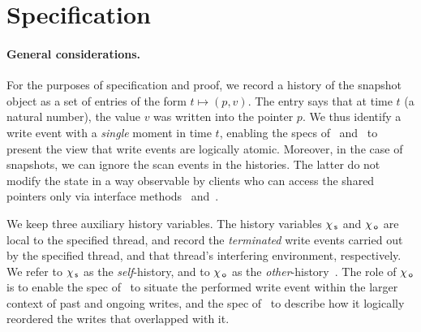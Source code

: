 \section{Specification}
\label{sc:formal}


\def\histx{\hist_\x}
\def\histy{\hist_\y}
\def\histp{\hist_p}

\newcommand{\sx}{S_\x}
\newcommand{\sy}{S_\y}
\newcommand{\spp}{S_p}
\newcommand{\sss}{S_s}
\newcommand{\wx}{W_\x}
\newcommand{\wy}{W_\y}
\newcommand{\wpp}{W_p}


\def\toff{t_{\mathsf{off}}}




\paragraph*{General considerations.}
%
For the purposes of specification and proof, we record a history of
the snapshot object as a set of entries of the form $t \mapsto (p,
v)$. The entry says that at time $t$ (a natural number), the value $v$
was written into the pointer $p$. We thus identify a write event with
a \emph{single} moment in time $t$, enabling the specs of
\jywrite\ and \jyscan\ to present the view that write events are
logically atomic.
%
Moreover, in the case of snapshots, we can ignore the scan events in
the histories. The latter do not modify the state in a way observable
by clients who can access the shared pointers only via interface
methods \jywrite\ and\ \jyscan.

We keep three auxiliary history variables. The history variables
$\chi_{\, \mathsf{s}}$ and $\chi_{\, \mathsf{o}}$ are local to the specified thread, and record
the \emph{terminated} write events carried out by the specified
thread, and that thread's interfering environment, respectively. We
refer to $\chi_{\, \mathsf{s}}$ as the \emph{self}-history, and to $\chi_{\, \mathsf{o}}$ as the
\emph{other}-history~\cite{LeyWildN+POPL13,NanevskiLSD+ESOP14,OPLSS:Notes,SergeyNB+ESOP15}. The role of 
$\chi_{\, \mathsf{o}}$ is to enable the spec of \jywrite\ to situate the performed
write event within the larger context of past and ongoing writes, and
the spec of \jyscan\ to describe how it logically reordered the writes
that overlapped with it.
%

